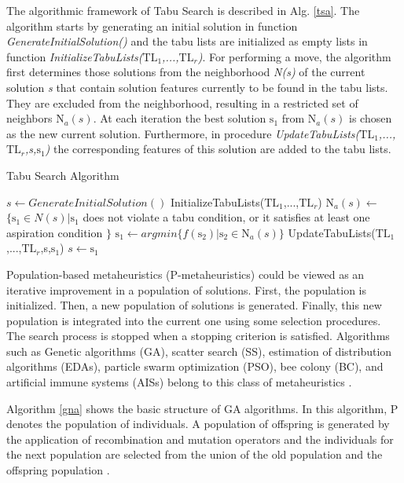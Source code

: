 \documentclass[review]{elsarticle}
\begin{document}
The algorithmic framework of Tabu Search is described in Alg. \ref{tsa}.  The algorithm starts by generating an initial solution in function \textit{GenerateInitialSolution()} and the tabu lists are initialized as empty lists in function \textit{InitializeTabuLists($\mbox{TL}_1$,...,$\mbox{TL}_r$)}. For performing a move, the algorithm first determines those solutions from the neighborhood \textit{N(s)} of the current solution \textit{s} that contain solution features currently to be found in the tabu lists. They are excluded from the neighborhood, resulting in a restricted set of neighbors \textit{$\mbox{N}_a(s)$}. At each iteration the best solution \textit{$\mbox{s}_1$} from \textit{$\mbox{N}_a(s)$} is chosen as the new current solution. Furthermore, in procedure \textit{UpdateTabuLists($\mbox{TL}_1$,...,$\mbox{TL}_r$,s,$\mbox{s}_1$)} the corresponding features of this solution are added to the tabu lists.


\begin{algorithm}[H]
  \caption{Tabu Search Algorithm}\label{tsa}
  \begin{algorithmic}[2]
    
    \State $s\gets GenerateInitialSolution()$
    \State InitializeTabuLists($\mbox{TL}_1$,...,$\mbox{TL}_r$)
    \State $\mbox{N}_a(s)\gets$ $\{\mbox{s}_1 \in N(s) |\mbox{s}_1$ does not violate a tabu condition, or it satisfies at least one aspiration condition $\}$ 
    \State $\mbox{s}_1\gets argmin\{f(\mbox{s}_2)|\mbox{s}_2 \in \mbox{N}_a(s) \}$
    \State UpdateTabuLists($\mbox{TL}_1$,...,$\mbox{TL}_r$,s,$\mbox{s}_1$)
    \State $s\gets \mbox{s}_1$
    \EndWhile
      
  \end{algorithmic}
\end{algorithm}

Population-based metaheuristics (P-metaheuristics) could be viewed as an iterative improvement in a population of solutions. First, the population is initialized. Then, a new population of solutions is generated. Finally, this new population is integrated into the current one using some selection procedures. The search process is stopped when a stopping criterion is satisfied. Algorithms such as Genetic algorithms (GA), scatter search (SS), estimation of distribution algorithms (EDAs), particle swarm optimization (PSO), bee colony (BC), and artificial immune systems (AISs) belong to this class of metaheuristics \cite{talbi2009metaheuristics}. 

Algorithm \ref{gna} shows the basic structure of GA algorithms. In this algorithm, P denotes the population of individuals. A population of offspring is generated by the application of recombination and mutation operators and the individuals for the next population are selected from the union of the old population and the offspring population \cite{raidl2010metaheuristic}.
\end{document}
